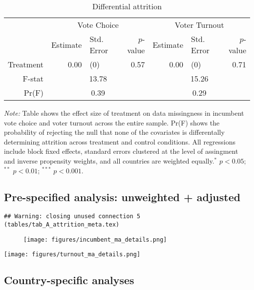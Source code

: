 \documentclass[]{article}
\begin{document}
\begin{table}[ht]
\caption{Differential attrition}
\centering
\begin{tabular}{rrlrrlr}
  \hline& \multicolumn{3}{c}{Vote Choice}&\multicolumn{3}{c}{Voter Turnout} \\
 & Estimate & Std. Error & $p$-value & Estimate & Std. Error & $p$-value \\ 
  \hline
Treatment & 0.00 & (0) & 0.57 & 0.00 & (0) & 0.71 \\ 
   \hline
F-stat & \multicolumn{3}{c}{13.78}&\multicolumn{3}{c}{15.26} \\
Pr(F) & \multicolumn{3}{c}{0.39}&\multicolumn{3}{c}{0.29} \\ \hline \hline
\end{tabular}
\begin{flushleft}\textit{Note:} Table shows the effect size of treatment on data missingness in incumbent vote choice and voter turnout across the entire sample. Pr(F) shows the probability of rejecting the null that none of the covariates is differentally determining attrition across treatment and control conditions. All regressions include block fixed effects, standard errors clustered at the level of assingment and inverse propensity weights, and all countries are weighted equally.$^*$ $p<0.05$; $^{**}$ $p<0.01$; $^{***}$ $p<0.001$. \end{flushleft}
\end{table}

\subsection{Pre-specified analysis: unweighted +
adjusted}\label{pre-specified-analysis-unweighted-adjusted}

\begin{verbatim}
## Warning: closing unused connection 5 (tables/tab_A_attrition_meta.tex)
\end{verbatim}

\begin{figure}[htbp]
\centering
\texttt{[image: figures/incumbent\_ma\_details.png]}
\caption{}
\end{figure}

\clearpage

\texttt{[image: figures/turnout\_ma\_details.png]} \clearpage

\subsection{Country-specific analyses}\label{country-specific-analyses}
\end{document}
